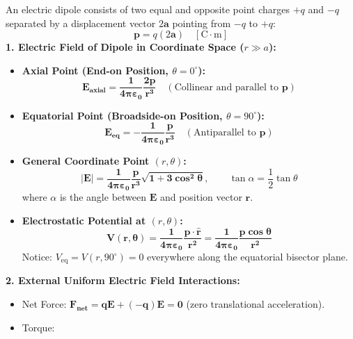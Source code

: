 \documentclass[10pt,a4paper]{article}
\begin{document}
\begin{formulabox}
An electric dipole consists of two equal and opposite point charges $+q$ and $-q$ separated by a displacement vector $2\mathbf{a}$ pointing from $-q$ to $+q$:
\begin{equation}
  \mathbf{p} = q(2\mathbf{a}) \quad [\mathrm{C}\cdot\mathrm{m}]
\end{equation}
\textbf{1. Electric Field of Dipole in Coordinate Space ($r \gg a$):}
\begin{itemize}
  \item \textbf{Axial Point (End-on Position, $\theta = 0^\circ$):}
  \begin{equation}
    \mathbf{E_{\text{axial}} = \frac{1}{4\pi\varepsilon_0} \frac{2\mathbf{p}}{r^3}} \quad (\text{Collinear and parallel to } \mathbf{p})
  \end{equation}
  \item \textbf{Equatorial Point (Broadside-on Position, $\theta = 90^\circ$):}
  \begin{equation}
    \mathbf{E_{\text{eq}} = -\frac{1}{4\pi\varepsilon_0} \frac{\mathbf{p}}{r^3}} \quad (\text{Antiparallel to } \mathbf{p})
  \end{equation}
  \item \textbf{General Coordinate Point $(r, \theta)$:}
  \begin{equation}
    \mathbf{|\mathbf{E}| = \frac{1}{4\pi\varepsilon_0} \frac{p}{r^3} \sqrt{1 + 3\cos^2\theta}}, \qquad \tan\alpha = \frac{1}{2}\tan\theta
  \end{equation}
  where $\alpha$ is the angle between $\mathbf{E}$ and position vector $\mathbf{r}$.
  \item \textbf{Electrostatic Potential at $(r, \theta)$:}
  \begin{equation}
    \mathbf{V(r, \theta) = \frac{1}{4\pi\varepsilon_0} \frac{\mathbf{p}\cdot\hat{\mathbf{r}}}{r^2} = \frac{1}{4\pi\varepsilon_0} \frac{p\cos\theta}{r^2}}
  \end{equation}
  Notice: $V_{\text{eq}} = V(r, 90^\circ) = 0$ everywhere along the equatorial bisector plane.
\end{itemize}
\textbf{2. External Uniform Electric Field Interactions:}
\begin{itemize}
  \item Net Force: $\mathbf{F_{\text{net}} = q\mathbf{E} + (-q)\mathbf{E} = 0}$ (zero translational acceleration).
  \item Torque:
  \begin{equation}

\end{equation}
\end{itemize}
\end{formulabox}
\end{document}
